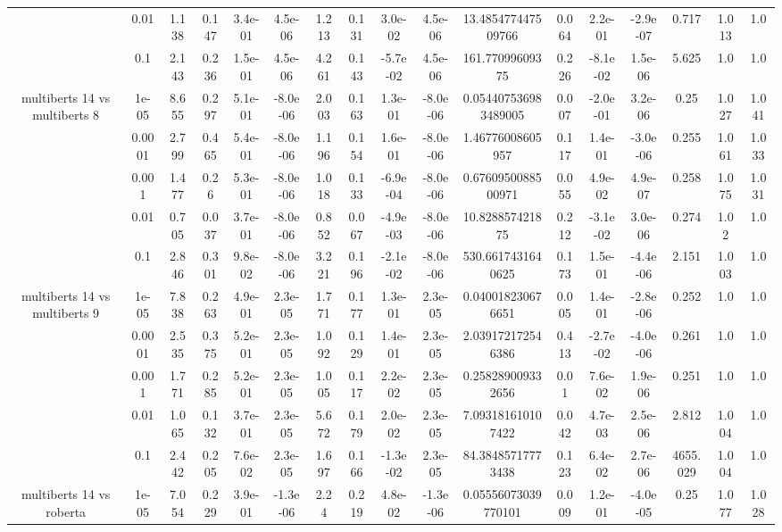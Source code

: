 \begin{tabular}{|c|c|c|c|c|c|c|c|c|c|c|c|c|c|c|c|c|}
 & 0.01 & 1.138 & 0.147 & 3.4e-01 & 4.5e-06 & 1.213 & 0.131 & 3.0e-02 & 4.5e-06 & 13.485477447509766 & 0.064 & 2.2e-01 & -2.9e-07 & 0.717 & 1.013 & 1.0 \\
 & 0.1 & 2.143 & 0.236 & 1.5e-01 & 4.5e-06 & 4.261 & 0.143 & -5.7e-02 & 4.5e-06 & 161.77099609375 & 0.226 & -8.1e-02 & 1.5e-06 & 5.625 & 1.0 & 1.0 \\
\hline
\multirow{5}{*}{multiberts 14 vs multiberts 8} & 1e-05 & 8.655 & 0.297 & 5.1e-01 & -8.0e-06 & 2.003 & 0.163 & 1.3e-01 & -8.0e-06 & 0.054407536983489005 & 0.007 & -2.0e-01 & 3.2e-06 & 0.25 & 1.027 & 1.041 \\
 & 0.0001 & 2.799 & 0.465 & 5.4e-01 & -8.0e-06 & 1.196 & 0.154 & 1.6e-01 & -8.0e-06 & 1.46776008605957 & 0.117 & 1.4e-01 & -3.0e-06 & 0.255 & 1.061 & 1.033 \\
 & 0.001 & 1.477 & 0.26 & 5.3e-01 & -8.0e-06 & 1.018 & 0.133 & -6.9e-04 & -8.0e-06 & 0.6760950088500971 & 0.055 & 4.9e-02 & 4.9e-07 & 0.258 & 1.075 & 1.031 \\
 & 0.01 & 0.705 & 0.037 & 3.7e-01 & -8.0e-06 & 0.852 & 0.067 & -4.9e-03 & -8.0e-06 & 10.828857421875 & 0.212 & -3.1e-02 & 3.0e-06 & 0.274 & 1.02 & 1.0 \\
 & 0.1 & 2.846 & 0.301 & 9.8e-02 & -8.0e-06 & 3.221 & 0.196 & -2.1e-02 & -8.0e-06 & 530.6617431640625 & 0.173 & 1.5e-01 & -4.4e-06 & 2.151 & 1.003 & 1.0 \\
\hline
\multirow{5}{*}{multiberts 14 vs multiberts 9} & 1e-05 & 7.838 & 0.263 & 4.9e-01 & 2.3e-05 & 1.771 & 0.177 & 1.3e-01 & 2.3e-05 & 0.040018230676651 & 0.005 & 1.4e-01 & -2.8e-06 & 0.252 & 1.0 & 1.0 \\
 & 0.0001 & 2.535 & 0.375 & 5.2e-01 & 2.3e-05 & 1.092 & 0.129 & 1.4e-01 & 2.3e-05 & 2.039172172546386 & 0.413 & -2.7e-02 & -4.0e-06 & 0.261 & 1.0 & 1.0 \\
 & 0.001 & 1.771 & 0.285 & 5.2e-01 & 2.3e-05 & 1.005 & 0.117 & 2.2e-02 & 2.3e-05 & 0.258289009332656 & 0.01 & 7.6e-02 & 1.9e-06 & 0.251 & 1.0 & 1.0 \\
 & 0.01 & 1.065 & 0.132 & 3.7e-01 & 2.3e-05 & 5.672 & 0.179 & 2.0e-02 & 2.3e-05 & 7.093181610107422 & 0.042 & 4.7e-03 & 2.5e-06 & 2.812 & 1.004 & 1.0 \\
 & 0.1 & 2.442 & 0.205 & 7.6e-02 & 2.3e-05 & 1.697 & 0.166 & -1.3e-02 & 2.3e-05 & 84.38485717773438 & 0.123 & 6.4e-02 & 2.7e-06 & 4655.029 & 1.004 & 1.0 \\
\hline
\multirow{5}{*}{multiberts 14 vs roberta } & 1e-05 & 7.054 & 0.229 & 3.9e-01 & -1.3e-06 & 2.24 & 0.219 & 4.8e-02 & -1.3e-06 & 0.05556073039770101 & 0.009 & 1.2e-01 & -4.0e-05 & 0.25 & 1.077 & 1.028 \\

\end{tabular}
